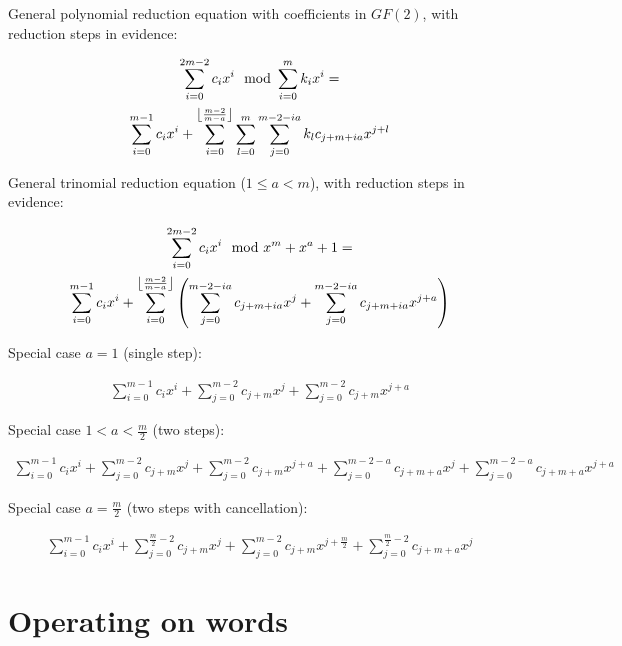 General polynomial reduction equation with coefficients in $GF(2)$, with reduction steps in evidence:

\begin{gather}
    \sum_{i = 0}^{2m - 2}{c_i x^i} \mod \sum_{i = 0}^{m}{k_i x^i} = \\
    \sum_{i = 0}^{m-1}{c_i x^i} + \sum_{i=0}^{\floor*{\frac{m - 2}{m - a}}}
        \sum_{l=0}^{m}{ \sum_{j = 0}^{m - 2 - ia}{k_l c_{j + m + ia} x^{j+l}}  }
\end{gather}

General trinomial reduction equation ($1 \le a < m$), with reduction steps in evidence:

\begin{gather}
    \sum_{i = 0}^{2m - 2}{c_i x^i} \mod x^m + x^a + 1 = \\
    \sum_{i = 0}^{m-1}{c_i x^i} + \sum_{i=0}^{\floor*{\frac{m - 2}{m - a}}} \left(
        \sum_{j = 0}^{m - 2 - ia}{c_{j + m + ia} x^j} +
        \sum_{j = 0}^{m - 2 - ia}{c_{j + m + ia} x^{j+a}}
    \right) 
\end{gather}

Special case $a=1$ (single step):

\begin{gather}
    \sum_{i = 0}^{m-1}{c_i x^i} +
        \sum_{j = 0}^{m - 2}{c_{j + m} x^j} +
        \sum_{j = 0}^{m - 2}{c_{j + m} x^{j+a}}
\end{gather}

Special case $1 < a < \frac{m}{2}$ (two steps):

\begin{gather}
    \sum_{i = 0}^{m-1}{c_i x^i} +
        \sum_{j = 0}^{m - 2}{c_{j + m} x^j} +
        \sum_{j = 0}^{m - 2}{c_{j + m} x^{j+a}} +
        \sum_{j = 0}^{m - 2 - a}{c_{j + m + a} x^j} +
        \sum_{j = 0}^{m - 2 - a}{c_{j + m + a} x^{j+a}}
\end{gather}

Special case $a = \frac{m}{2}$ (two steps with cancellation):

\begin{gather}
    \sum_{i = 0}^{m-1}{c_i x^i} +
        \sum_{j = 0}^{\frac{m}{2} - 2}{c_{j + m} x^j} +
        \sum_{j = 0}^{m - 2}{c_{j + m} x^{j+\frac{m}{2}}} +
        \sum_{j = 0}^{\frac{m}{2} - 2}{c_{j + m + a} x^j}
\end{gather}


\section{Operating on words}\label{operating-on-words}

